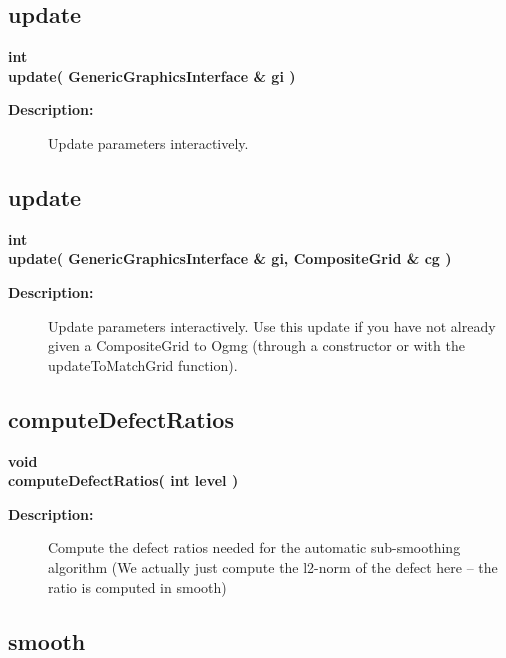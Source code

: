 \subsection{update}
 
\begin{flushleft} \textbf{%
int  \\ 
\settowidth{\OgmgIncludeArgIndent}{update(}%
update( GenericGraphicsInterface \& gi )
}\end{flushleft}
\begin{description}
\item[{\bf Description:}] 
   Update parameters interactively.
\end{description}
\subsection{update}
 
\begin{flushleft} \textbf{%
int  \\ 
\settowidth{\OgmgIncludeArgIndent}{update(}%
update( GenericGraphicsInterface \& gi, CompositeGrid \& cg  )
}\end{flushleft}
\begin{description}
\item[{\bf Description:}] 
   Update parameters interactively. Use this update if you have not already given a
 CompositeGrid to Ogmg (through a constructor or with the updateToMatchGrid function).

\end{description}
\subsection{computeDefectRatios}
 
\begin{flushleft} \textbf{%
void  \\ 
\settowidth{\OgmgIncludeArgIndent}{computeDefectRatios(}%
computeDefectRatios( int level )
}\end{flushleft}
\begin{description}
\item[{\bf Description:}] 
  Compute the defect ratios needed for the automatic sub-smoothing algorithm
  (We actually just compute the l2-norm of the defect here -- the ratio is computed in smooth)
\end{description}
\subsection{smooth}
 
